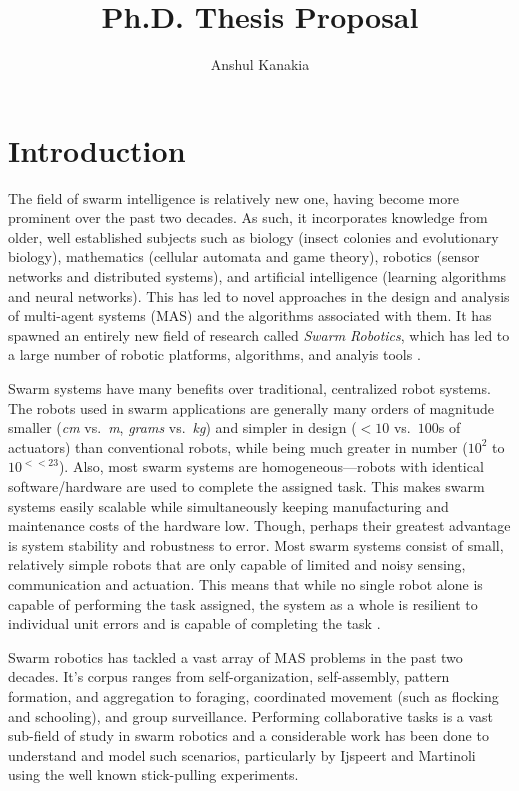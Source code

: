 \documentclass[11pt, onecolumn, compsoc, letterpaper]{article}
\begin{document}
\title{Ph.D. Thesis Proposal}
\author{Anshul Kanakia}

\maketitle

\section{Introduction}
The field of swarm intelligence is relatively new one, having become more prominent over the past two decades. As such, it incorporates knowledge from older, well established subjects such as biology (insect colonies and evolutionary biology), mathematics (cellular automata and game theory), robotics (sensor networks and distributed systems), and artificial intelligence (learning algorithms and neural networks). This has led to novel approaches in the design and analysis of multi-agent systems (MAS) and the algorithms associated with them. It has spawned an entirely new field of research called \emph{Swarm Robotics}\cite{Sahin2005}, which has led to a large number of robotic platforms, algorithms, and analyis tools \cite{Brambilla2013}.

Swarm systems have many benefits over traditional, centralized robot systems. The robots used in swarm applications are generally many orders of magnitude smaller (\emph{cm} vs.~\emph{m}, \emph{grams} vs.~\emph{kg}) and simpler in design ($<10$ vs.~$100$s of actuators) than conventional robots, while being much greater in number ($10^2$ to $10^{<<23}$). Also, most swarm systems are homogeneous---robots with identical software/hardware are used to complete the assigned task. This makes swarm systems easily scalable while simultaneously keeping manufacturing and maintenance costs of the hardware low. Though, perhaps their greatest advantage is system stability and robustness to error. Most swarm systems consist of small, relatively simple robots that are only capable of limited and noisy sensing, communication and actuation. This means that while no single robot alone is capable of performing the task assigned, the system as a whole is resilient to individual unit errors and is capable of completing the task \cite{Winfield2005}.

Swarm robotics has tackled a vast array of MAS problems in the past two decades. It's corpus ranges from self-organization, self-assembly, pattern formation, and aggregation to foraging, coordinated movement (such as flocking and schooling), and group surveillance. Performing collaborative tasks is a vast sub-field of study in swarm robotics and a considerable work has been done to understand and model such scenarios, particularly by Ijspeert and Martinoli using the well known stick-pulling experiments. 
\end{document}
